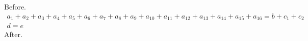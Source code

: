 \documentclass[10pt]{article}
\begin{document}
Before.
\begin{gather}
 a_1 + a_2 + a_3 + a_4 + a_5 + a_6 + a_7 + a_8 + a_9 + a_{10} + a_{11} + a_{12} + a_{13} + a_{14} + a_{15} + a_{16} = b + c_1 + c_2 \tag{tag $\ast$ here}\\
 d = e
\end{gather}
After.
\end{document}
